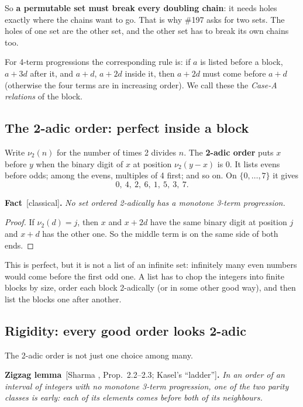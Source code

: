 \documentclass[11pt,letterpaper]{article}
\newcommand{\nut}{\nu_2}
\newcommand{\st}[1]{\textnormal{\textsf{\small[#1]}}}
\newenvironment{result}[2]%
  {\par\medskip\noindent\textbf{#1}\ \st{#2}\textbf{.}\enspace\itshape}%
  {\par\medskip}
\begin{document}
So \textbf{a permutable set must break every doubling chain}: it needs holes exactly where the chains want
to go. That is why \#197 asks for two sets. The holes of one set are the other set, and the other set has to
break its own chains too.

For 4-term progressions the corresponding rule is: if $a$ is listed before a block, $a+3d$ after it, and
$a+d$, $a+2d$ inside it, then $a+2d$ must come before $a+d$ (otherwise the four terms are in increasing
order). We call these the \emph{Case-A relations} of the block.

\subsection{The 2-adic order: perfect inside a block}

Write $\nut(n)$ for the number of times 2 divides $n$. The \textbf{2-adic order} puts $x$ before $y$ when the
binary digit of $x$ at position $\nut(y-x)$ is 0. It lists evens before odds; among the evens, multiples of 4
first; and so on. On $\{0,\dots,7\}$ it gives
\[ 0,\ 4,\ 2,\ 6,\ 1,\ 5,\ 3,\ 7 . \]

\begin{result}{Fact}{classical}
No set ordered 2-adically has a monotone 3-term progression.
\end{result}

\begin{proof}
If $\nut(d) = j$, then $x$ and $x+2d$ have the same binary digit at position $j$ and $x+d$ has the other
one. So the middle term is on the same side of both ends.
\end{proof}

This is perfect, but it is not a list of an infinite set: infinitely many even numbers would come before the
first odd one. A list has to chop the integers into finite blocks by size, order each block 2-adically (or
in some other good way), and then list the blocks one after another.

\subsection{Rigidity: every good order looks 2-adic}\label{sec:rigid}

The 2-adic order is not just one choice among many.

\begin{result}{Zigzag lemma}{Sharma \cite{Sharma}, Prop.~2.2--2.3; Kasel's ``ladder''}
In an order of an interval of integers with no monotone 3-term progression, one of the two parity classes
is \emph{early}: each of its elements comes before both of its neighbours.
\end{result}
\end{document}
